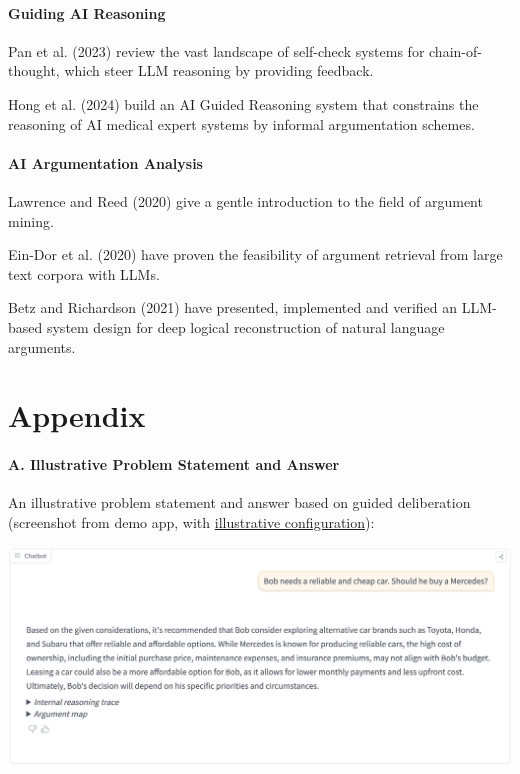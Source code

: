 \documentclass[
  letterpaper,
  DIV=11,
  numbers=noendperiod]{scrartcl}
\let\oldparagraph\paragraph
\renewcommand{\paragraph}[1]{\oldparagraph{#1}\mbox{}}
\begin{document}
\hypertarget{guiding-ai-reasoning}{%
\paragraph{Guiding AI Reasoning}\label{guiding-ai-reasoning}}

Pan et al. (2023) review the vast landscape of self-check systems for
chain-of-thought, which steer LLM reasoning by providing feedback.

Hong et al. (2024) build an AI Guided Reasoning system that constrains
the reasoning of AI medical expert systems by informal argumentation
schemes.

\hypertarget{ai-argumentation-analysis}{%
\paragraph{AI Argumentation Analysis}\label{ai-argumentation-analysis}}

Lawrence and Reed (2020) give a gentle introduction to the field of
argument mining.

Ein-Dor et al. (2020) have proven the feasibility of argument retrieval
from large text corpora with LLMs.

Betz and Richardson (2021) have presented, implemented and verified an
LLM-based system design for deep logical reconstruction of natural
language arguments.

\hypertarget{appendix}{%
\section{Appendix}\label{appendix}}

\hypertarget{appendix-example-problem}{%
\paragraph{A. Illustrative Problem Statement and
Answer}\label{appendix-example-problem}}

An illustrative problem statement and answer based on guided
deliberation (screenshot from demo app, with
\protect\hyperlink{appendix-sys-config}{illustrative configuration}):

\includegraphics{figs/illustrative_problem_and_answer.png}
\end{document}
